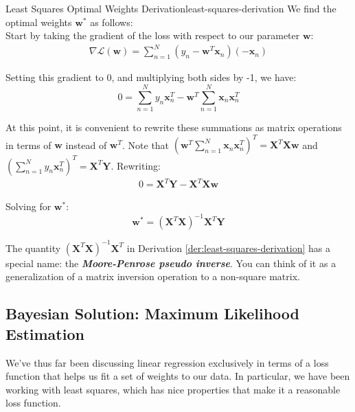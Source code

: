 \begin{derivation}{Least Squares Optimal Weights Derivation}{least-squares-derivation}
    We find the optimal weights $\textbf{w}^{*}$ as follows: \\

    Start by taking the gradient of the loss with respect to our parameter $\textbf{w}$:
    \begin{align*}
        \nabla \mathcal{L}(\textbf{w}) = \sum_{n=1}^{N} (y_{n} - \textbf{w}^{T}\textbf{x}_{n})(-\textbf{x}_{n})
    \end{align*}

    Setting this gradient to 0, and multiplying both sides by -1, we have:
    \begin{equation} \label{least-squares-solving-for-w}
        0 = \sum_{n=1}^{N} y_{n} \textbf{x}_{n}^{T} - \textbf{w}^{T} \sum_{n=1}^{N} \textbf{x}_{n}\textbf{x}_{n}^{T}
    \end{equation}

    At this point, it is convenient to rewrite these summations as matrix operations in terms of $\textbf{w}$ instead of $\textbf{w}^{T}$. Note that $(\textbf{w}^{T} \sum_{n=1}^{N} \textbf{x}_{n}\textbf{x}_{n}^{T})^{T} = \textbf{X}^{T}\textbf{X}\textbf{w}$ and $(\sum_{n=1}^{N} y_{n} \textbf{x}_{n}^{T})^{T} = \textbf{X}^{T}\textbf{Y}$. Rewriting:
    \begin{align*}
        0 = \textbf{X}^{T}\textbf{Y} - \textbf{X}^{T}\textbf{X}\textbf{w}
    \end{align*}

    Solving for $\textbf{w}^{*}$:
    \begin{equation} \label{least-squares-solved-for-w}
        \textbf{w}^{*} = (\textbf{X}^{T}\textbf{X})^{-1}\textbf{X}^{T}\textbf{Y}
    \end{equation}
\end{derivation}

The quantity $(\textbf{X}^{T}\textbf{X})^{-1}\textbf{X}^{T}$ in Derivation \ref{der:least-squares-derivation} has a special name: the \textbf{\textit{Moore-Penrose pseudo inverse}}. You can think of it as a generalization of a matrix inversion operation to a non-square matrix.

\subsection{Bayesian Solution: Maximum Likelihood Estimation}
We've thus far been discussing linear regression exclusively in terms of a loss function that helps us fit a set of weights to our data. In particular, we have been working with least squares, which has nice properties that make it a reasonable loss function.

